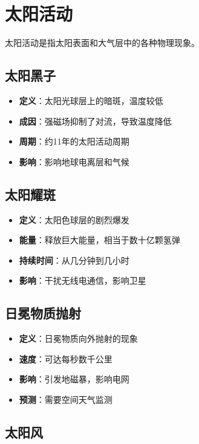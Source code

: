 \documentclass[12pt,UTF8]{ctexbook}
\begin{document}
\section{太阳活动}

太阳活动是指太阳表面和大气层中的各种物理现象。

\subsection{太阳黑子}

\begin{itemize}
  \item \textbf{定义}：太阳光球层上的暗斑，温度较低
  \item \textbf{成因}：强磁场抑制了对流，导致温度降低
  \item \textbf{周期}：约11年的太阳活动周期
  \item \textbf{影响}：影响地球电离层和气候
\end{itemize}

\subsection{太阳耀斑}

\begin{itemize}
  \item \textbf{定义}：太阳色球层的剧烈爆发
  \item \textbf{能量}：释放巨大能量，相当于数十亿颗氢弹
  \item \textbf{持续时间}：从几分钟到几小时
  \item \textbf{影响}：干扰无线电通信，影响卫星
\end{itemize}

\subsection{日冕物质抛射}

\begin{itemize}
  \item \textbf{定义}：日冕物质向外抛射的现象
  \item \textbf{速度}：可达每秒数千公里
  \item \textbf{影响}：引发地磁暴，影响电网
  \item \textbf{预测}：需要空间天气监测
\end{itemize}

\subsection{太阳风}
\end{document}
